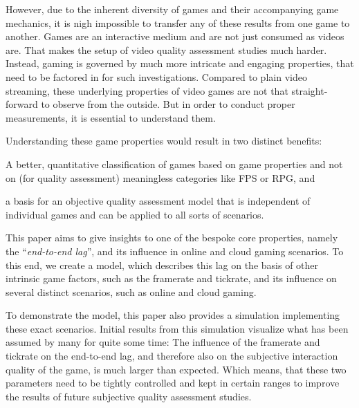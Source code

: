 However, due to the inherent diversity of games and their accompanying game mechanics, it is nigh impossible to transfer any of these results from one game to another. Games are an interactive medium and are not just consumed as videos are. That makes the setup of video quality assessment studies much harder. Instead, gaming is governed by much more intricate and engaging properties, that need to be factored in for such investigations. Compared to plain video streaming, these underlying properties of video games are not that straight-forward to observe from the outside. But in order to conduct proper measurements, it is essential to understand them.

Understanding these game properties would result in two distinct benefits:
\begin{enumerate*}
	\item A better, quantitative classification of games based on game properties and not on (for quality assessment) meaningless categories like \gls{FPS} or \gls{RPG}, and
	\item a basis for an objective quality assessment model that is independent of individual games and can be applied to all sorts of scenarios.
\end{enumerate*}

This paper aims to give insights to one of the bespoke core properties, namely the ``\textit{end-to-end lag}'', and its influence in online and cloud gaming scenarios. To this end, we create a model, which describes this lag on the basis of other intrinsic game factors, such as the framerate and tickrate, and its influence on several distinct scenarios, such as online and cloud gaming.

To demonstrate the model, this paper also provides a simulation implementing these exact scenarios. Initial results from this simulation visualize what has been assumed by many for quite some time: The influence of the framerate and tickrate on the end-to-end lag, and therefore also on the subjective interaction quality of the game, is much larger than expected. Which means, that these two parameters need to be tightly controlled and kept in certain ranges to improve the results of future subjective quality assessment studies.


